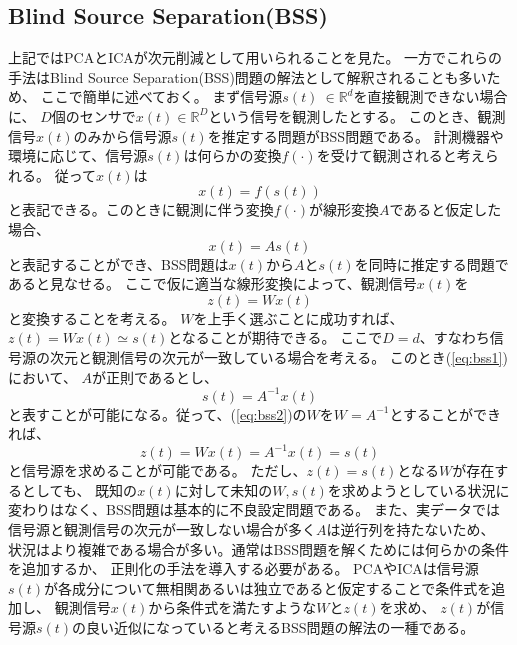 \subsection{\rm Blind Source Separation(BSS)}
上記ではPCAとICAが次元削減として用いられることを見た。
一方でこれらの手法はBlind Source Separation(BSS)問題の解法として解釈されることも多いため、
ここで簡単に述べておく。
まず信号源\(s(t)\ \in \mathbb R^d\)を直接観測できない場合に、
\(D\)個のセンサで\(x(t) \in \mathbb R^D\)という信号を観測したとする。
このとき、観測信号\(x(t)\)のみから信号源\(s(t)\)を推定する問題がBSS問題である。
計測機器や環境に応じて、信号源\(s(t)\)は何らかの変換\(f(\cdot)\)を受けて観測されると考えられる。
従って\(x(t)\)は
\begin{equation}
    x(t)=f(s(t))
\end{equation}
と表記できる。このときに観測に伴う変換\(f(\cdot)\)が線形変換\(A\)であると仮定した場合、
\begin{equation}
    x(t)=As(t)
    \label{eq:bss1}
\end{equation}
と表記することができ、BSS問題は\(x(t)\)から\(A\)と\(s(t)\)を同時に推定する問題であると見なせる。
ここで仮に適当な線形変換によって、観測信号\(x(t)\)を
\begin{equation}
    z(t)=Wx(t)
    \label{eq:bss2}
\end{equation}
と変換することを考える。
\(W\)を上手く選ぶことに成功すれば、\(z(t)=Wx(t) \simeq s(t)\)となることが期待できる。
ここで\(D=d\)、すなわち信号源の次元と観測信号の次元が一致している場合を考える。
このとき(\ref{eq:bss1})において、
\(A\)が正則であるとし、
\begin{equation}
    s(t)=A^{-1}x(t)
\end{equation}
と表すことが可能になる。従って、(\ref{eq:bss2})の\(W\)を\(W=A^{-1}\)とすることができれば、
\begin{equation}
    z(t)=Wx(t)=A^{-1}x(t)=s(t)
\end{equation}
と信号源を求めることが可能である。
ただし、\(z(t)=s(t)\)となる\(W\)が存在するとしても、
既知の\(x(t)\)に対して未知の\(W,s(t)\)を求めようとしている状況に変わりはなく、BSS問題は基本的に不良設定問題である。
また、実データでは信号源と観測信号の次元が一致しない場合が多く\(A\)は逆行列を持たないため、
状況はより複雑である場合が多い。通常はBSS問題を解くためには何らかの条件を追加するか、
正則化の手法を導入する必要がある。
PCAやICAは信号源\(s(t)\)が各成分について無相関あるいは独立であると仮定することで条件式を追加し、
観測信号\(x(t)\)から条件式を満たすような\(W\)と\(z(t)\)を求め、
\(z(t)\)が信号源\(s(t)\)の良い近似になっていると考えるBSS問題の解法の一種である。

